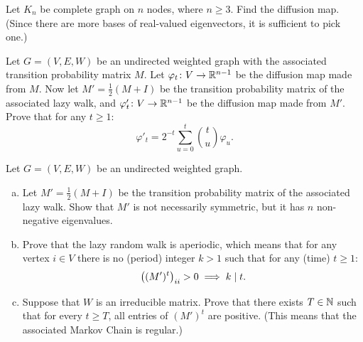 \begin{myexercise}\label{prob:diffusion_map_complete_graph}
    Let $K_n$ be complete graph on $n$ nodes, where $n \geq 3$. Find the diffusion map. (Since there are more bases of real-valued eigenvectors, it is sufficient to pick one.)
\end{myexercise}

\begin{myexercise}\label{prob:diffusion_map_lazy_walk}
    Let $G = (V, E, W)$ be an undirected weighted graph with the associated transition probability matrix $M$. Let $\varphi_t \colon V \to \mathbb{R}^{n-1}$ be the diffusion map made from $M$. Now let $M' = \frac{1}{2}(M + I)$ be the transition probability matrix of the associated lazy walk, and $\varphi'_t \colon V \to \mathbb{R}^{n-1}$ be the diffusion map made from $M'$. Prove that for any $t \geq 1$:
    \begin{equation*}
        \varphi'_t = 2^{-t}\sum_{u=0}^t {t \choose u} \varphi_u.
    \end{equation*}
\end{myexercise}

\begin{myexercise}\label{prob:aperiodicity_lazy_walk}
    Let $G = (V, E, W)$ be an undirected weighted graph.
    \begin{enumerate}[(a)]
        \item Let $M' = \frac{1}{2}(M + I)$ be the transition probability matrix of the associated lazy walk. Show that $M'$ is not necessarily symmetric, but it has $n$ non-negative eigenvalues.

        \item Prove that the lazy random walk is aperiodic, which means that for any vertex $i \in V$ there is no (period) integer $k > 1$ such that for any (time) $t \geq 1$:
        \begin{equation*}
            \left( (M')^t \right)_{ii} > 0 \implies k \mid t.
        \end{equation*}
        
        \item Suppose that $W$ is an irreducible matrix. Prove that there exists $T \in \mathbb{N}$ such that for every $t \geq T$, all entries of $(M')^t$ are positive. (This means that the associated Markov Chain is regular.)
    \end{enumerate}
\end{myexercise}

